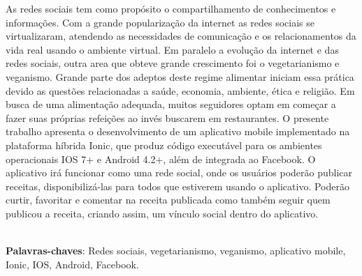 \begin{resumo}
As redes sociais tem como propósito o compartilhamento de conhecimentos e informações. Com a grande popularização da internet as redes sociais se virtualizaram, atendendo as necessidades de comunicação e os relacionamentos da vida real usando o ambiente virtual. Em paralelo a evolução da internet e das redes sociais, outra area que obteve grande crescimento foi o vegetarianismo e veganismo. Grande parte dos adeptos deste regime alimentar iniciam essa prática devido as questões relacionadas a saúde, economia, ambiente, ética e religião. Em busca de uma alimentação adequada, muitos seguidores optam em começar a fazer suas próprias refeições ao invés buscarem em restaurantes. O presente trabalho apresenta o desenvolvimento de um aplicativo mobile implementado na plataforma híbrida Ionic, que produz código executável para os ambientes operacionais IOS 7+ e Android 4.2+, além de integrada ao Facebook. O aplicativo irá funcionar como uma rede social, onde os usuários poderão publicar receitas, disponibilizá-las para todos que estiverem usando o aplicativo. Poderão curtir, favoritar e comentar na receita publicada como também seguir quem publicou a receita, criando assim, um vínculo social dentro do aplicativo.

\vspace{\onelineskip}
\noindent\\
\textbf{Palavras-chaves}: Redes sociais, vegetarianismo, veganismo, aplicativo mobile, Ionic, IOS, Android, Facebook.
\end{resumo}